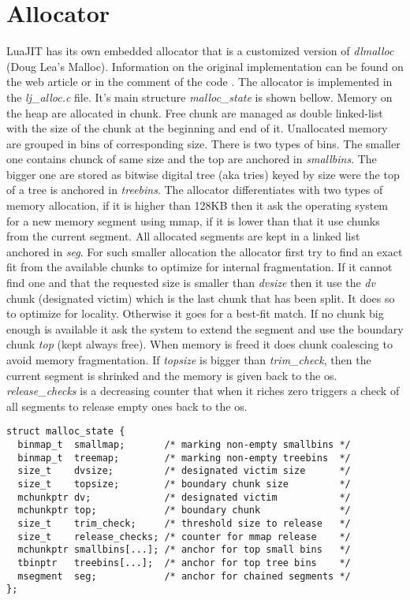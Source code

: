 
\section{Allocator}
\label{Sec:alloc}

LuaJIT has its own embedded allocator that is a customized version of \emph{dlmalloc}
(Doug Lea's Malloc). Information on the original implementation can be found on
the web article \cite{dlmalloc-art} or in the comment of the code
\cite{dlmalloc-impl}. The allocator is implemented in the \emph{lj\_alloc.c}
file. It's main structure \emph{malloc\_state} is shown bellow. Memory on the
heap are allocated in chunk. Free chunk are managed as double linked-list with
the size of the chunk at the beginning and end of it. Unallocated memory are
grouped in bins of corresponding size. There is two types of bins. The
smaller one contains chunck of same size and the top are anchored in
\emph{smallbins}. The bigger one are stored as bitwise digital tree (aka tries)
keyed by size were the top of a tree is anchored in \emph{treebins}. The
allocator differentiates with two types of memory allocation, if it is higher than
128KB then it ask the operating system for a new memory segment using mmap, if
it is lower than that it use chunks from the current segment. All allocated
segments are kept in a linked list anchored in \emph{seg}. For such smaller
allocation the allocator first try to find an exact fit from the available
chunks to optimize for internal fragmentation. If it cannot find one and that
the requested size is smaller than \emph{dvsize} then it use the \emph{dv}
chunk (designated victim) which is the last chunk that has been split. It does
so to optimize for locality. Otherwise it goes for a best-fit match. If no chunk
big enough is available it ask the system to extend the segment and use the
boundary chunk \emph{top} (kept always free). When memory is freed it does chunk
coalescing to avoid memory fragmentation. If \emph{topsize} is bigger than
\emph{trim\_check}, then the current segment is shrinked and the memory is given
back to the os. \emph{release\_checks} is a decreasing counter that when it
riches zero triggers a check of all segments to release empty ones back to the os.

\begin{lstlisting}[style=CStyle]
struct malloc_state {
  binmap_t  smallmap;       /* marking non-empty smallbins */
  binmap_t  treemap;        /* marking non-empty treebins  */
  size_t    dvsize;         /* designated victim size      */
  size_t    topsize;        /* boundary chunk size         */
  mchunkptr dv;             /* designated victim           */
  mchunkptr top;            /* boundary chunk              */
  size_t    trim_check;     /* threshold size to release   */
  size_t    release_checks; /* counter for mmap release    */
  mchunkptr smallbins[...]; /* anchor for top small bins   */
  tbinptr   treebins[...];  /* anchor for top tree bins    */
  msegment  seg;            /* anchor for chained segments */
};
\end{lstlisting}

